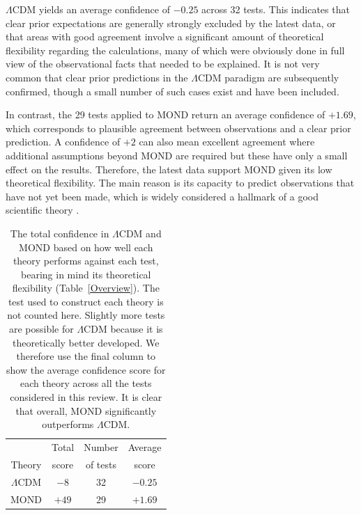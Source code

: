 \documentclass[fleqn,usenatbib,useAMS,onecolumn]{mnras} %
\begin{document}
$\Lambda$CDM yields an average confidence of $-0.25$ across 32 tests. This indicates that clear prior expectations are generally strongly excluded by the latest data, or that areas with good agreement involve a significant amount of theoretical flexibility regarding the calculations, many of which were obviously done in full view of the observational facts that needed to be explained. It is not very common that clear prior predictions in the $\Lambda$CDM paradigm are subsequently confirmed, though a small number of such cases exist and have been included.

In contrast, the 29 tests applied to MOND return an average confidence of $+1.69$, which corresponds to plausible agreement between observations and a clear prior prediction. A confidence of $+2$ can also mean excellent agreement where additional assumptions beyond MOND are required but these have only a small effect on the results. Therefore, the latest data support MOND given its low theoretical flexibility. The main reason is its capacity to predict observations that have not yet been made, which is widely considered a hallmark of a good scientific theory \citep{Merritt_2020}.

\begin{table}
	\centering
	\caption{The total confidence in $\Lambda$CDM and MOND based on how well each theory performs against each test, bearing in mind its theoretical flexibility (Table~\ref{Overview}). The test used to construct each theory is not counted here. Slightly more tests are possible for $\Lambda$CDM because it is theoretically better developed. We therefore use the final column to show the average confidence score for each theory across all the tests considered in this review. It is clear that overall, MOND significantly outperforms $\Lambda$CDM.}
	\begin{tabular}{cccc}
		\hline
		 & Total & Number & Average \\
		Theory & score & of tests & score \\ \hline
		$\Lambda$CDM & $-8$ & 32 & $-0.25$ \\
		MOND & $+49$ & 29 & $+1.69$ \\ \hline
	\end{tabular}
	\label{Final_scores}
\end{table}
\end{document}
